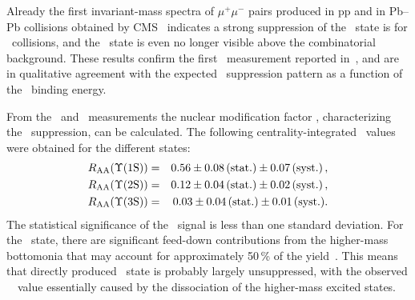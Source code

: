 Already the first invariant-mass spectra of $\mu^+\mu^-$ pairs produced in pp and in Pb--Pb collisions obtained by CMS~\cite{Chatrchyan:2012lxa} indicates
 a strong suppression of the \PgUb\ state is for \PbPb\ collisions, and the \PgUc\ state is even no longer visible above the combinatorial background. These results confirm the first \PgU\ measurement reported in~\cite{CMS_Y_2010}, and are in qualitative agreement with the expected \PgU\ suppression pattern as a function of the \PgUn\ binding energy.


From the \PbPb\ and \pp\ measurements the nuclear modification factor \Raa, characterizing the \PgU\ suppression,
can be calculated. The following centrality-integrated \Raa\ values were obtained for the different \PgUn states:
\begin{eqnarray}
R_\mathrm{AA} (\Upsilon\mathrm{(1S)}) &=& 0.56 \pm 0.08\,\mbox{(stat.)} \pm 0.07\,\mbox{(syst.)} \,, \nonumber \\
R_\mathrm{AA} (\Upsilon\mathrm{(2S)}) &=& 0.12 \pm 0.04\,\mbox{(stat.)} \pm 0.02\,\mbox{(syst.)} \,,  \\
R_\mathrm{AA} (\Upsilon\mathrm{(3S)}) &=& 0.03 \pm 0.04\,\mbox{(stat.)} \pm 0.01\,\mbox{(syst.)} .  \nonumber
\end{eqnarray}
The statistical significance of the \PgUc\ signal is less than one standard deviation.
For the \PgUa\ state, there are significant feed-down contributions from the higher-mass bottomonia that may account for approximately 50\,\% of the yield~\cite{Affolder:1999wm, Aaij:2012se}.
This means that directly produced \PgUa\ state is probably largely unsuppressed, with
the observed \PgUa\ \Raa\ value essentially caused by the dissociation of the higher-mass excited states.


